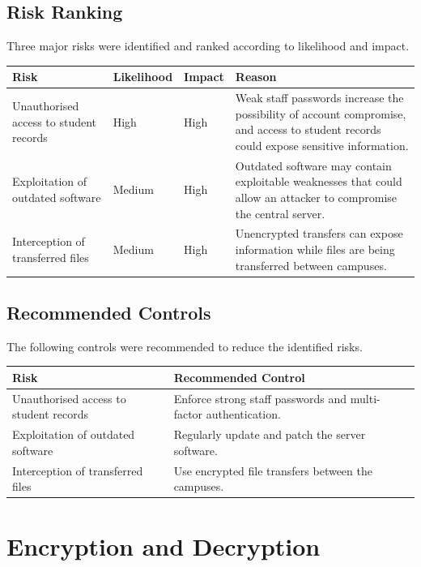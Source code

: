 \documentclass[12pt,a4paper]{article}
\begin{document}
\subsection{Risk Ranking}

Three major risks were identified and ranked according to likelihood and
impact.

\begin{longtable}{p{} p{} p{} p{}}
\toprule
\textbf{Risk} & \textbf{Likelihood} & \textbf{Impact} & \textbf{Reason} \\
\midrule
Unauthorised access to student records &
High &
High &
Weak staff passwords increase the possibility of account compromise,
and access to student records could expose sensitive information. \\

Exploitation of outdated software &
Medium &
High &
Outdated software may contain exploitable weaknesses that could allow
an attacker to compromise the central server. \\

Interception of transferred files &
Medium &
High &
Unencrypted transfers can expose information while files are being
transferred between campuses. \\
\bottomrule
\end{longtable}

\subsection{Recommended Controls}

The following controls were recommended to reduce the identified risks.

\begin{longtable}{p{} p{}}
\toprule
\textbf{Risk} & \textbf{Recommended Control} \\
\midrule
Unauthorised access to student records &
Enforce strong staff passwords and multi-factor authentication. \\

Exploitation of outdated software &
Regularly update and patch the server software. \\

Interception of transferred files &
Use encrypted file transfers between the campuses. \\
\bottomrule
\end{longtable}

\section{Encryption and Decryption}
\end{document}
